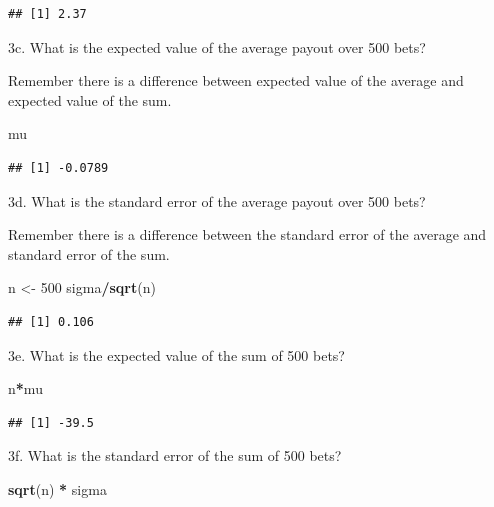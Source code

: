 \documentclass[
]{article}
\newenvironment{Shaded}{\begin{snugshade}}{\end{snugshade}}
\newcommand{\DecValTok}[1]{\textcolor[rgb]{0.00,0.00,0.81}{#1}}
\newcommand{\KeywordTok}[1]{\textcolor[rgb]{0.13,0.29,0.53}{\textbf{#1}}}
\newcommand{\NormalTok}[1]{#1}
\newcommand{\OperatorTok}[1]{\textcolor[rgb]{0.81,0.36,0.00}{\textbf{#1}}}
\newcommand{\StringTok}[1]{\textcolor[rgb]{0.31,0.60,0.02}{#1}}
\begin{document}
\begin{verbatim}
## [1] 2.37
\end{verbatim}

3c. What is the expected value of the average payout over 500 bets?

Remember there is a difference between expected value of the average and
expected value of the sum.

\begin{Shaded}
\begin{Highlighting}[]
\NormalTok{mu}
\end{Highlighting}
\end{Shaded}

\begin{verbatim}
## [1] -0.0789
\end{verbatim}

3d. What is the standard error of the average payout over 500 bets?

Remember there is a difference between the standard error of the average
and standard error of the sum.

\begin{Shaded}
\begin{Highlighting}[]
\NormalTok{n \textless{}{-}}\StringTok{ }\DecValTok{500}
\NormalTok{sigma}\OperatorTok{/}\KeywordTok{sqrt}\NormalTok{(n)}
\end{Highlighting}
\end{Shaded}

\begin{verbatim}
## [1] 0.106
\end{verbatim}

3e. What is the expected value of the sum of 500 bets?

\begin{Shaded}
\begin{Highlighting}[]
\NormalTok{n}\OperatorTok{*}\NormalTok{mu}
\end{Highlighting}
\end{Shaded}

\begin{verbatim}
## [1] -39.5
\end{verbatim}

3f. What is the standard error of the sum of 500 bets?

\begin{Shaded}
\begin{Highlighting}[]
\KeywordTok{sqrt}\NormalTok{(n) }\OperatorTok{*}\StringTok{ }\NormalTok{sigma}
\end{Highlighting}
\end{Shaded}
\end{document}
